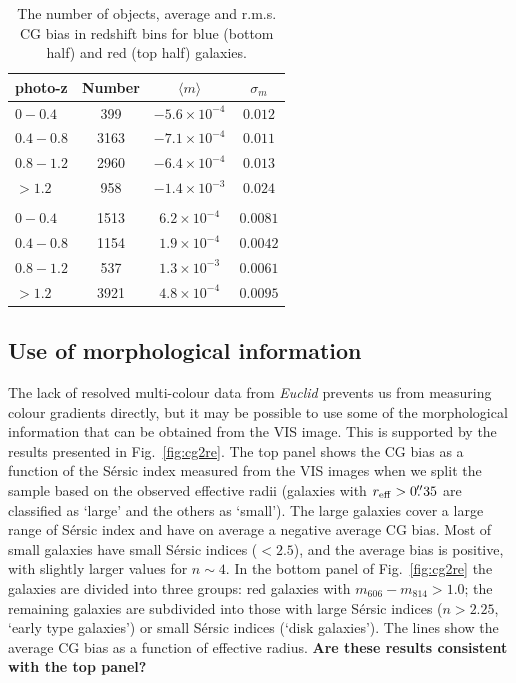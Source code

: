 \documentclass[useAMS,usenatbib]{mnras}
\begin{document}
\begin{table}
\begin{center}
  \begin{tabular}{lccc}
    \hline
    photo-z    &Number &$\langle m\rangle$  &$\sigma_m$ \\
    \hline
    $0-0.4$    &399  &$-5.6\times10^{-4}$  &$0.012$\\
    $0.4-0.8$  &3163 &$-7.1\times10^{-4}$  &$0.011$\\
    $0.8-1.2$  &2960 &$-6.4\times10^{-4}$  &$0.013$\\
    $>1.2$     &958  &$-1.4\times10^{-3}$  &$0.024$\\
    \\
    $0-0.4$  &1513  &$6.2\times10^{-4}$  &$0.0081$\\
    $0.4-0.8$ &1154  &$1.9\times10^{-4}$  &$0.0042$\\
    $0.8-1.2$ &537  &$1.3\times10^{-3}$  &$0.0061$\\
    $>1.2$  & 3921  &$4.8\times10^{-4}$  &$0.0095$\\
    \hline
  \end{tabular}
  \caption{The number of objects, average and r.m.s. CG bias 
  in redshift bins for blue (bottom half) and red (top half) galaxies. }
  \label{table:calibration}
\end{center}
\end{table}

\subsection{Use of morphological information}

The lack of resolved multi-colour data from {\it Euclid} prevents us from
measuring colour gradients directly, but it may be possible to use some of the morphological
information that can be obtained from the VIS image. This is supported by the results
presented in Fig.~\ref{fig:cg2re}. The top panel shows the CG bias as a function of the 
S{\'e}rsic index measured from the VIS images when we split the sample based on the
observed effective radii (galaxies with $r_{\rm eff}>0\hbox{$.\!\!^{\prime\prime}$} 35$ are classified as `large' 
and the others as `small'). The large galaxies cover a large range of S{\'e}rsic index and have on average a negative average CG bias. Most of small galaxies have small S{\'e}rsic indices ($<2.5$), and
the average bias is positive, with slightly larger values for $n\sim 4$.
In the bottom panel of Fig.~\ref{fig:cg2re} the galaxies are divided into three groups: red galaxies
with $m_{606}-m_{814}>1.0$; the remaining galaxies are subdivided into those with 
large S{\'e}rsic indices ($n>2.25$, `early type galaxies') or small S{\'e}rsic indices (`disk galaxies').
The lines show the average CG bias as a function of effective radius. {\bf Are these results
consistent with the top panel?}
\end{document}
